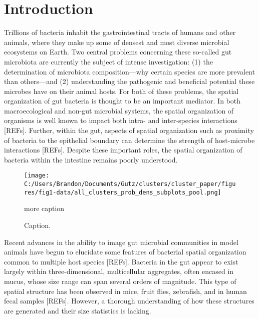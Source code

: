 \documentclass[aps,pre,twocolumn]{revtex4-1}
\begin{document}
\section{Introduction}
Trillions of bacteria inhabit the gastrointestinal tracts of humans and other animals, where they make up some of densest and most diverse microbial ecosystems on Earth. Two central problems concerning these so-called gut microbiota are currently the subject of intense investigation: (1) the determination of microbiota composition---why certain species are more prevalent than others---and (2) understanding the pathogenic and beneficial potential these microbes have on their animal hosts. For both of these problems, the spatial organization of gut bacteria is thought to be an important mediator. In both macroecological and non-gut microbial systems, the spatial organization of organisms is well known to impact both intra- and inter-species interactions [REFs]. Further, within the gut, aspects of spatial organization such as proximity of bacteria to the epithelial boundary can determine the strength of host-microbe interactions [REFs]. Despite these important roles, the spatial organization of bacteria within the intestine remains poorly understood.

\begin{figure*}%
	\centerline{
		\texttt{[image: C:/Users/Brandon/Documents/Gutz/clusters/cluster\_paper/figures/fig1-data/all\_clusters\_prob\_dens\_subplots\_pool.png]}}
	\caption{Caption.}{more caption}
	\label{fig:data-fig}
\end{figure*}


Recent advances in the ability to image gut microbial communities in model animals have begun to elucidate some features of bacterial spatial organization common to multiple host species [REFs]. Bacteria in the gut appear to exist largely within three-dimensional, multicellular aggregates, often encased in mucus, whose size range can span several orders of magnitude. This type of spatial structure has been observed in mice, fruit flies, zebrafish, and in human fecal samples [REFs]. However, a thorough understanding of how these structures are generated and their size statistics is lacking. 
\end{document}
